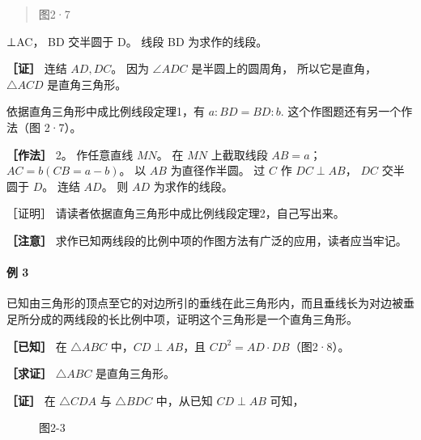 \begin{quote}
图2·7
\end{quote}

⊥AC， BD 交半圆于 D。 线段 BD 为求作的线段。

\textbf{［证］} 连结 \(AD, DC\)。 因为 \(\angle ADC\) 是半圆上的圆周角，
所以它是直角， \(\triangle ACD\) 是直角三角形。

依据直角三角形中成比例线段定理1，有 \(a:BD = BD:b.\)
这个作图题还有另一个作法（图 2·7）。

\textbf{［作法］} 2。 作任意直线 \(MN\)。 在 \(MN\) 上截取线段
\(AB = a\)； \(AC = b (CB = a - b)\)。 以 \(AB\) 为直径作半圆。 过 \(C\)
作 \(DC \perp AB\)， \(DC\) 交半圆于 \(D\)。 连结 \(AD\)。 则 \(AD\)
为求作的线段。

［证明］ 请读者依据直角三角形中成比例线段定理2，自己写出来。

\textbf{［注意］}
求作已知两线段的比例中项的作图方法有广泛的应用，读者应当牢记。

\paragraph{例 3}

已知由三角形的顶点至它的对边所引的垂线在此三角形内，而且垂线长为对边被垂足所分成的两线段的长比例中项，证明这个三角形是一个直角三角形。

\textbf{［已知］} 在 \(\triangle ABC\) 中，\(CD \perp AB\)，且
\(CD^2 = AD \cdot DB\)（图2·8）。

\textbf{［求证］} \(\triangle ABC\) 是直角三角形。

\textbf{［证］} 在 \(\triangle CDA\) 与 \(\triangle BDC\) 中，从已知
\(CD \perp AB\) 可知，

\begin{figure}
\centering
{}
\caption{图2-3}
\end{figure}

